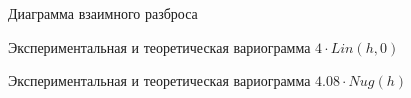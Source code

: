 \begin{figure}[H]
\caption{Диаграмма взаимного разброса}
\label{img:hscat}
\end{figure}

\begin{figure}[H]
\caption{Экспериментальная и теоретическая вариограмма $ 4 \cdot Lin(h, 0) $}
\label{img:lin-modeled}
\end{figure}

\begin{figure}[H]
\caption{Экспериментальная и теоретическая вариограмма $ 4.08 \cdot Nug(h) $}
\label{img:lin-fit}
\end{figure}

